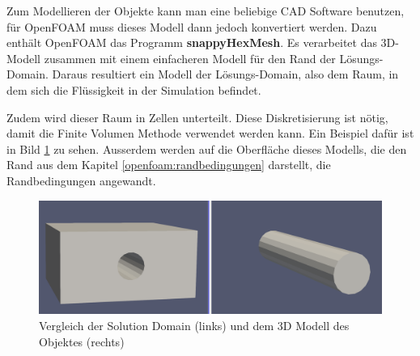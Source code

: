 Zum Modellieren der Objekte kann man eine beliebige CAD Software benutzen, für OpenFOAM muss dieses Modell dann jedoch konvertiert werden.
Dazu enthält OpenFOAM das Programm \textbf{snappyHexMesh}.
Es verarbeitet das 3D-Modell zusammen mit einem einfacheren Modell für den Rand der Lösungs-Domain. 
Daraus resultiert ein Modell der Lösungs-Domain, also dem Raum, in dem sich die Flüssigkeit in der Simulation befindet.

Zudem wird dieser Raum in Zellen unterteilt.
Diese Diskretisierung ist nötig, damit die Finite Volumen Methode verwendet werden kann.
Ein Beispiel dafür ist in Bild \ref{openfoam:fig:SD_Modell_vergleich} zu sehen.
Ausserdem werden auf die Oberfläche dieses Modells, die den Rand aus dem Kapitel \ref{openfoam:randbedingungen} darstellt, die Randbedingungen angewandt.
\begin{figure}
	\centering
	\includegraphics[scale=0.1]{papers/openfoam/Bilder/vergleich_solution_domain_object.png}
	\caption{Vergleich der Solution Domain (links) und dem 3D Modell des Objektes (rechts)}
	\label{openfoam:fig:SD_Modell_vergleich}
\end{figure}

